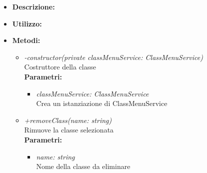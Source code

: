 \begin{itemize}
	\item \textbf{Descrizione:}\\
	
	\item \textbf{Utilizzo:}\\
	
	\item \textbf{Metodi:}
		\begin{itemize}
			\item \emph{-constructor(private classMenuService: ClassMenuService)}\\
    		Costruttore della classe\\
    		\textbf{Parametri:}
    		\begin{itemize}
    			\item \emph{classMenuService: ClassMenuService}\\
    			Crea un istanziazione di ClassMenuService
    		\end{itemize}
    		\item \emph{+removeClass(name: string)}\\
    		Rimuove la classe selezionata\\
    		\textbf{Parametri:}
    		\begin{itemize}
    			\item \emph{name: string}\\
    			Nome della classe da eliminare
    		\end{itemize}
		\end{itemize}
\end{itemize}